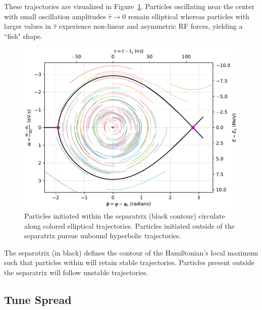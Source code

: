 These trajectories are visualized in Figure~\ref{fig:fisheye}. Particles oscillating near the center with small oscillation amplitudes $\hat{\tau}\to 0$ remain elliptical whereas particles with larger values in $\hat{\tau}$ experience non-linear and asymmetric RF forces, yielding a ``fish" shape.

\begin{figure}
    \centering
    \includegraphics{figs/single_particle_motion/trajectories.pdf}
    \caption{Particles initiated within the separatrix (black contour) circulate along colored elliptical trajectories. Particles initiated outside of the separatrix pursue unbound hyperbolic trajectories.}
    \label{fig:fisheye}
\end{figure}

The separatrix (in black) defines the contour of the Hamiltonian's local maximum such that particles within will retain stable trajectories. Particles present outside the separatrix will follow unstable trajectories.

\subsection{Tune Spread}

